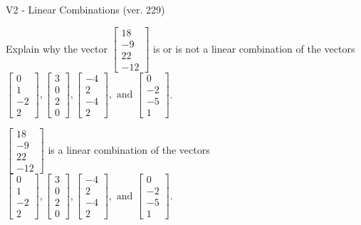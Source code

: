 \begin{exercise}
  \begin{exerciseTitle}V2 - Linear Combinations (ver. 229)\end{exerciseTitle}
  \begin{exerciseStatement}
    Explain why the vector \(\left[\begin{array}{c}
18 \\
-9 \\
22 \\
-12
\end{array}\right]\)  is or is not a linear 
	combination of the vectors \(\left[\begin{array}{c}
0 \\
1 \\
-2 \\
2
\end{array}\right] , \left[\begin{array}{c}
3 \\
0 \\
2 \\
0
\end{array}\right] , \left[\begin{array}{c}
-4 \\
2 \\
-4 \\
2
\end{array}\right] , \text{ and } \left[\begin{array}{c}
0 \\
-2 \\
-5 \\
1
\end{array}\right]\).
	


  \end{exerciseStatement}
  \begin{exerciseAnswer}
   \(\left[\begin{array}{c}
18 \\
-9 \\
22 \\
-12
\end{array}\right]\) 
  	 is  
	a linear combination of the vectors \(\left[\begin{array}{c}
0 \\
1 \\
-2 \\
2
\end{array}\right] , \left[\begin{array}{c}
3 \\
0 \\
2 \\
0
\end{array}\right] , \left[\begin{array}{c}
-4 \\
2 \\
-4 \\
2
\end{array}\right] , \text{ and } \left[\begin{array}{c}
0 \\
-2 \\
-5 \\
1
\end{array}\right]\).


\end{exerciseAnswer}
\end{exercise}
